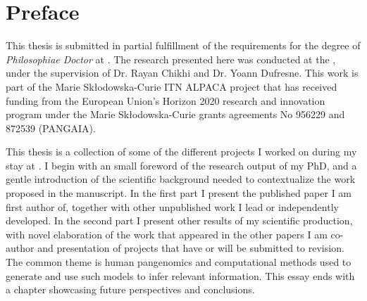 \chapter{Preface}
This thesis is submitted in partial fulfillment of the requirements for the degree of \emph{Philosophiae Doctor} at \sorbonne.
The research presented here was conducted at the \pasteur, under the supervision of Dr. Rayan Chikhi and Dr. Yoann Dufresne.
This work is part of the Marie Skłodowska-Curie ITN ALPACA project that has received funding from the European Union’s Horizon 2020 research and innovation program under the Marie Skłodowska-Curie grants agreements No \num{956229} and \num{872539} (PANGAIA).

This thesis is a collection of some of the different projects I worked on during my stay at \pasteur. I begin with an small foreword of the research output of my PhD, and a gentle introduction of the scientific background needed to contextualize the work proposed in the manuscript. In the first part I present the published paper I am first author of, together with other unpublished work I lead or independently developed. In the second part I present other results of my scientific production, with novel elaboration of the work that appeared in the other papers I am co-author and presentation of projects that have or will be submitted to revision.
The common theme is human pangenomics and computational methods used to generate and use such models to infer relevant information.  
This essay ends with a chapter showcasing future perspectives and conclusions.

